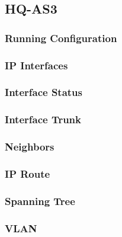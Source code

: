 \subsection{HQ-AS3}
\subsubsection{Running Configuration}


\subsubsection{IP Interfaces}


\subsubsection{Interface Status}


\subsubsection{Interface Trunk}


\subsubsection{Neighbors}


\subsubsection{IP Route}


\subsubsection{Spanning Tree}


\subsubsection{VLAN}





